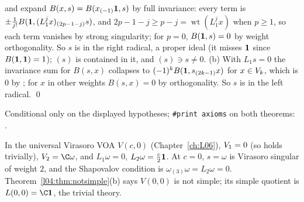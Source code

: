 and expand $B(x,s) = B(x_{(-1)}\mathbf{1},s)$ by full invariance: every term is $\pm\frac1{j!}
B(\mathbf{1},(L_1^jx)_{(2p-1-j)}s)$, and $2p-1-j\ge p-j = \operatorname{wt}(L_1^jx)$ when $p\ge1$, so each
term vanishes by strong singularity; for $p = 0$, $B(\mathbf{1},s) = 0$ by weight orthogonality. So $s$ is
in the right radical, a proper ideal (it misses $\mathbf{1}$ since $B(\mathbf{1},\mathbf{1}) = 1$); $(s)$ is
contained in it, and $(s)\ni s\ne0$. (b) With $L_1s = 0$ the invariance sum for $B(s,x)$ collapses to
$(-1)^kB(\mathbf{1},s_{(2k-1)}x)$ for $x\in V_k$, which is $0$ by ; for $x$ in other weights
$B(s,x) = 0$ by orthogonality. So $s$ is in the left radical. \qed
\begin{status}
Conditional only on the displayed hypotheses; \texttt{\#print axioms} on both  theorems:
.
\end{status}

\begin{example}\label{l04:ex:c0}
In the universal Virasoro VOA $V(c,0)$ (Chapter~\ref{ch:L06}), $V_1 = 0$ (so  holds
trivially), $\lfourV_2 = \C\omega$, and $L_1\omega = 0$, $L_2\omega = \tfrac c2\mathbf{1}$. At $c = 0$,
$s = \omega$ is Virasoro singular of weight $2$, and the Shapovalov condition is
$\omega_{(3)}\omega = L_2\omega = 0$. Theorem~\ref{l04:thm:notsimple}(b) says $V(0,0)$ is not simple; its
simple quotient is $L(0,0) = \C\lfourvac$, the trivial theory.
\end{example}

